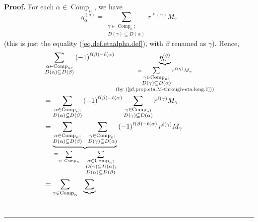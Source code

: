 \documentclass[numbers=enddot,12pt,final,onecolumn,notitlepage]{scrartcl}%
\theoremstyle{definition}
\newenvironment{proof}[1][Proof]{\noindent\textbf{#1.} }{\ \rule{0.5em}{0.5em}}
\let\sumnonlimits\sum
\renewcommand{\sum}{\sumnonlimits\limits}
\newenvironment{verlong}{}{}
\begin{document}
\begin{verlong}
\begin{proof}
For each $\alpha\in\operatorname*{Comp}\nolimits_{n}$, we have%
\begin{equation}
\eta_{\alpha}^{\left(  q\right)  }=\sum_{\substack{\gamma\in
\operatorname*{Comp}\nolimits_{n};\\D\left(  \gamma\right)  \subseteq D\left(
\alpha\right)  }}r^{\ell\left(  \gamma\right)  }M_{\gamma}
\label{pf.prop.eta.M-through-eta.long.1}%
\end{equation}
(this is just the equality (\ref{eq.def.etaalpha.def}), with $\beta$ renamed
as $\gamma$). Hence,%
\begin{align}
&  \sum_{\substack{\alpha\in\operatorname*{Comp}\nolimits_{n};\\D\left(
\alpha\right)  \subseteq D\left(  \beta\right)  }}\left(  -1\right)
^{\ell\left(  \beta\right)  -\ell\left(  \alpha\right)  }\underbrace{\eta
_{\alpha}^{\left(  q\right)  }}_{\substack{=\sum_{\substack{\gamma
\in\operatorname*{Comp}\nolimits_{n};\\D\left(  \gamma\right)  \subseteq
D\left(  \alpha\right)  }}r^{\ell\left(  \gamma\right)  }M_{\gamma}\\\text{(by
(\ref{pf.prop.eta.M-through-eta.long.1}))}}}\nonumber\\
&  =\sum_{\substack{\alpha\in\operatorname*{Comp}\nolimits_{n};\\D\left(
\alpha\right)  \subseteq D\left(  \beta\right)  }}\left(  -1\right)
^{\ell\left(  \beta\right)  -\ell\left(  \alpha\right)  }\sum
_{\substack{\gamma\in\operatorname*{Comp}\nolimits_{n};\\D\left(
\gamma\right)  \subseteq D\left(  \alpha\right)  }}r^{\ell\left(
\gamma\right)  }M_{\gamma}\nonumber\\
&  =\underbrace{\sum_{\substack{\alpha\in\operatorname*{Comp}\nolimits_{n}%
;\\D\left(  \alpha\right)  \subseteq D\left(  \beta\right)  }}\ \ \sum
_{\substack{\gamma\in\operatorname*{Comp}\nolimits_{n};\\D\left(
\gamma\right)  \subseteq D\left(  \alpha\right)  }}}_{=\sum_{\gamma
\in\operatorname*{Comp}\nolimits_{n}}\ \ \sum_{\substack{\alpha\in
\operatorname*{Comp}\nolimits_{n};\\D\left(  \gamma\right)  \subseteq D\left(
\alpha\right)  ;\\D\left(  \alpha\right)  \subseteq D\left(  \beta\right)  }%
}}\left(  -1\right)  ^{\ell\left(  \beta\right)  -\ell\left(  \alpha\right)
}r^{\ell\left(  \gamma\right)  }M_{\gamma}\nonumber\\
&  =\sum_{\gamma\in\operatorname*{Comp}\nolimits_{n}}\ \ \underbrace{\sum
}
\end{align}
\end{proof}
\end{verlong}
\end{document}
